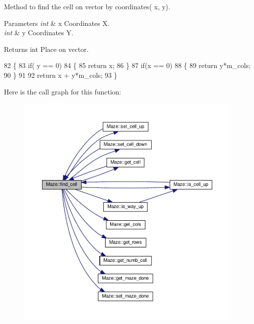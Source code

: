 Method to find the cell on vector by coordinates( x, y). 


\begin{DoxyParams}{Parameters}
{\em int} & x Coordinates X. \\
\hline
{\em int} & y Coordinates Y. \\
\hline
\end{DoxyParams}
\begin{DoxyReturn}{Returns}
int Place on vector. 
\end{DoxyReturn}

\begin{DoxyCode}
82         \{
83             \textcolor{keywordflow}{if}( y == 0)
84             \{
85                 \textcolor{keywordflow}{return} x;
86             \}
87             \textcolor{keywordflow}{if}(x == 0)
88             \{
89                 \textcolor{keywordflow}{return} y*m\_cols;
90             \}
91 
92             \textcolor{keywordflow}{return} x + y*m\_cols;
93         \}
\end{DoxyCode}
Here is the call graph for this function\+:\nopagebreak
\begin{figure}[H]
\begin{center}
\leavevmode
\includegraphics[width=350pt]{classMaze_aa59b935dcd5f7129636cea6e40882c56_cgraph}
\end{center}
\end{figure}
